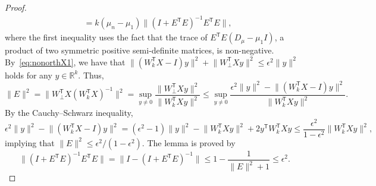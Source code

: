 \documentclass{siamart190516}
\newcommand{\Ttran}{\mathsf{T}}
\newcommand{\R}{\mathbb{R}}
\providecommand{\norm}[1]{\lVert#1\rVert}
\begin{document}
\begin{proof}
\begin{equation*}
\begin{aligned}
            &= k(\mu_{n}-\mu_{1})\norm{(I+E^{\Ttran}E)^{-1}E^{\Ttran}E},
        \end{aligned}
    \end{equation*}
    where the first inequality uses the fact that the trace of $E^{\Ttran}E(D_{\mu}-\mu_{1}I)$, a product of two symmetric positive semi-definite matrices, is non-negative.
    By~\cref{eq:nonorthX1}, we have that $\norm{(W_{k}^{\Ttran}X-I)y}^{2}+\norm{W_{\perp}^{\Ttran}Xy}^{2}\leq \epsilon^{2}\norm{y}^{2}$ holds for any $y\in\R^{k}$. Thus,
    \begin{equation*}
        \norm{E}^{2} = \norm{W_{\perp}^{\Ttran}X(W_{k}^{\Ttran}X)^{-1}}^{2} =  \sup_{y\neq 0}\frac{\norm{W_{\perp}^{\Ttran}Xy}^{2}}{\norm{W_{k}^{\Ttran}Xy}^{2}} \leq \sup_{y\neq 0}\frac{\epsilon^{2}\norm{y}^{2}-\norm{(W_{k}^{\Ttran}X-I)y}^{2}}{\norm{W_{k}^{\Ttran}Xy}^{2}}.
    \end{equation*}
    By the Cauchy--Schwarz inequality,
    \begin{equation*}
        \epsilon^{2}\norm{y}^{2}-\norm{(W_{k}^{\Ttran}X-I)y}^{2} = (\epsilon^{2}-1)\norm{y}^{2}-\norm{W_{k}^{\Ttran}Xy}^{2}+2y^{\Ttran}W_{k}^{\Ttran}Xy\leq \frac{\epsilon^{2}}{1-\epsilon^{2}} \norm{W_{k}^{\Ttran}Xy}^{2},
    \end{equation*}
    implying that $\norm{E}^{2}\leq \epsilon^{2}/(1-\epsilon^{2})$.
    The lemma is proved by 
    \begin{equation*}
        \norm{(I+E^{\Ttran}E)^{-1}E^{\Ttran}E} = \norm{I-(I+E^{\Ttran}E)^{-1}}\leq 1-\frac{1}{\norm{E}^{2}+1} \leq \epsilon^{2}.
    \end{equation*}
\end{proof}
\end{document}

